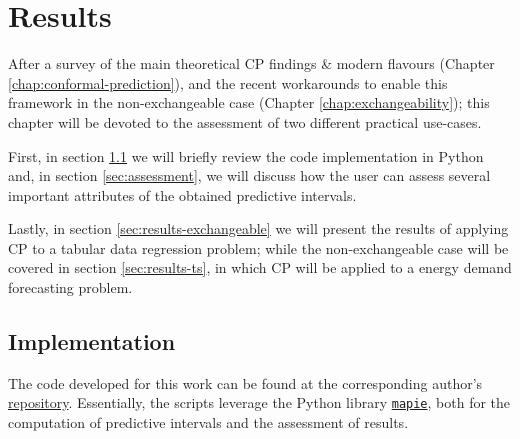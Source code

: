 \chapter{Results}\label{chap:results}

After a survey of the main theoretical CP findings \& modern flavours (Chapter \ref{chap:conformal-prediction}), and the recent workarounds to enable this framework in the non-exchangeable case (Chapter \ref{chap:exchangeability}); this chapter will be devoted to the assessment of two different practical use-cases.

First, in section \ref{sec:implementation} we will briefly review the code implementation in Python and, in section \ref{sec:assessment}, we will discuss how the user can assess several important attributes of the obtained predictive intervals.

Lastly, in section \ref{sec:results-exchangeable} we will present the results of applying CP to a tabular data regression problem; while the non-exchangeable case will be covered in section \ref{sec:results-ts}, in which CP will be applied to a energy demand forecasting problem.

\section{Implementation}\label{sec:implementation}

The code developed for this work can be found at the corresponding author's \href{https://github.com/gcastro-98/conformal-prediction}{repository}. Essentially, the scripts leverage the Python library \href{https://mapie.readthedocs.io/en/stable/index.html#}{\texttt{mapie}}, both for the computation of predictive intervals and the assessment of results.

